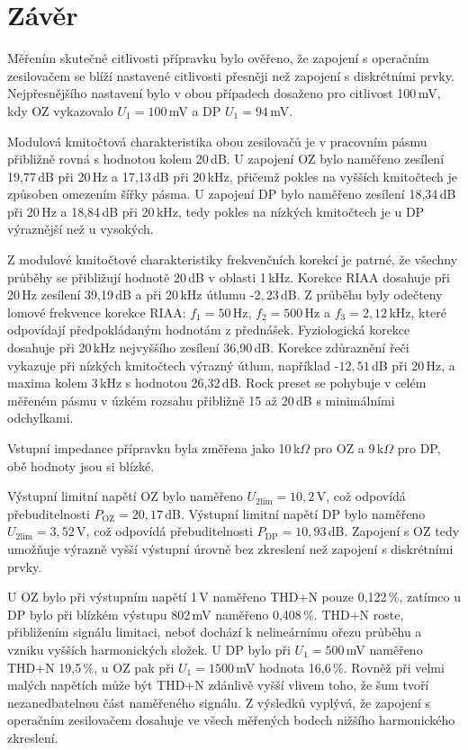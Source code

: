 \documentclass[a4paper, czech]{article}
\begin{document}
\section{Závěr}

Měřením skutečné citlivosti přípravku bylo ověřeno, že zapojení s operačním zesilovačem se blíží nastavené citlivosti přesněji než zapojení s diskrétními prvky.
Nejpřesnějšího nastavení bylo v obou případech dosaženo pro citlivost 100\,mV, kdy OZ vykazovalo $U_1 = 100$\,mV a DP $U_1 = 94$\,mV.

Modulová kmitočtová charakteristika obou zesilovačů je v pracovním pásmu přibližně rovná s hodnotou kolem 20\,dB.
U zapojení OZ bylo naměřeno zesílení 19,77\,dB při 20\,Hz a 17,13\,dB při 20\,kHz, přičemž pokles na vyšších kmitočtech je způsoben omezením šířky pásma.
U zapojení DP bylo naměřeno zesílení 18,34\,dB při 20\,Hz a 18,84\,dB při 20\,kHz, tedy pokles na nízkých kmitočtech je u DP výraznější než u vysokých.

Z modulové kmitočtové charakteristiky frekvenčních korekcí je patrné, že všechny průběhy se přibližují hodnotě 20\,dB v oblasti 1\,kHz.
Korekce RIAA dosahuje při 20\,Hz zesílení 39,19\,dB a při 20\,kHz útlumu -$2{,}23$\,dB.
Z průběhu byly odečteny lomové frekvence korekce RIAA: $f_1 = 50$\,Hz, $f_2 = 500$\,Hz a $f_3 = 2{,}12$\,kHz, které odpovídají předpokládaným hodnotám z přednášek.
Fyziologická korekce dosahuje při 20\,kHz nejvyššího zesílení 36,90\,dB.
Korekce zdůraznění řeči vykazuje při nízkých kmitočtech výrazný útlum, například -$12{,}51$\,dB při 20\,Hz, a maxima kolem 3\,kHz s hodnotou 26,32\,dB.
Rock preset se pohybuje v celém měřeném pásmu v úzkém rozsahu přibližně 15 až 20\,dB s minimálními odchylkami.

Vstupní impedance přípravku byla změřena jako 10\,k$\Omega$ pro OZ a 9\,k$\Omega$ pro DP, obě hodnoty jsou si blízké.

Výstupní limitní napětí OZ bylo naměřeno $U_{2\mathrm{lim}} = 10{,}2$\,V, což odpovídá přebuditelnosti $P_\mathrm{OZ} = 20{,}17$\,dB.
Výstupní limitní napětí DP bylo naměřeno $U_{2\mathrm{lim}} = 3{,}52$\,V, což odpovídá přebuditelnosti $P_\mathrm{DP} = 10{,}93$\,dB.
Zapojení s OZ tedy umožňuje výrazně vyšší výstupní úrovně bez zkreslení než zapojení s diskrétními prvky.

U OZ bylo při výstupním napětí 1\,V naměřeno THD+N pouze 0,122\,\%, zatímco u DP bylo při blízkém výstupu 802\,mV naměřeno 0,408\,\%.
THD+N  roste, přibližením signálu limitaci, neboť dochází k nelineárnímu ořezu průběhu a vzniku vyšších harmonických složek.
U DP bylo při $U_1 = 500$\,mV naměřeno THD+N 19,5\,\%, u OZ pak při $U_1 = 1500$\,mV hodnota 16,6\,\%.
Rovněž při velmi malých napětích může být THD+N zdánlivě vyšší vlivem toho, že šum tvoří nezanedbatelnou část naměřeného signálu.
Z výsledků vyplývá, že zapojení s operačním zesilovačem dosahuje ve všech měřených bodech nižšího harmonického zkreslení.
\end{document}
